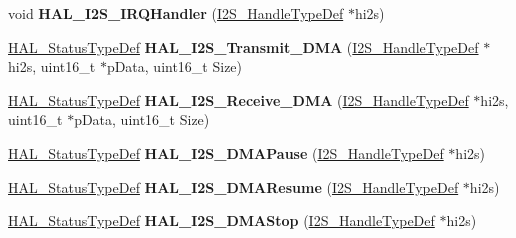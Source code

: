 \begin{DoxyCompactItemize}
\item 
void {\bfseries H\+A\+L\+\_\+\+I2\+S\+\_\+\+I\+R\+Q\+Handler} (\hyperlink{struct_i2_s___handle_type_def}{I2\+S\+\_\+\+Handle\+Type\+Def} $\ast$hi2s)\hypertarget{group___i2_s___exported___functions___group2_gad5fe9157152a3c5baac47b877d534f4e}{}\label{group___i2_s___exported___functions___group2_gad5fe9157152a3c5baac47b877d534f4e}

\item 
\hyperlink{stm32f4xx__hal__def_8h_a63c0679d1cb8b8c684fbb0632743478f}{H\+A\+L\+\_\+\+Status\+Type\+Def} {\bfseries H\+A\+L\+\_\+\+I2\+S\+\_\+\+Transmit\+\_\+\+D\+MA} (\hyperlink{struct_i2_s___handle_type_def}{I2\+S\+\_\+\+Handle\+Type\+Def} $\ast$hi2s, uint16\+\_\+t $\ast$p\+Data, uint16\+\_\+t Size)\hypertarget{group___i2_s___exported___functions___group2_ga97fa0c086e3980597e1e3962b2dfc322}{}\label{group___i2_s___exported___functions___group2_ga97fa0c086e3980597e1e3962b2dfc322}

\item 
\hyperlink{stm32f4xx__hal__def_8h_a63c0679d1cb8b8c684fbb0632743478f}{H\+A\+L\+\_\+\+Status\+Type\+Def} {\bfseries H\+A\+L\+\_\+\+I2\+S\+\_\+\+Receive\+\_\+\+D\+MA} (\hyperlink{struct_i2_s___handle_type_def}{I2\+S\+\_\+\+Handle\+Type\+Def} $\ast$hi2s, uint16\+\_\+t $\ast$p\+Data, uint16\+\_\+t Size)\hypertarget{group___i2_s___exported___functions___group2_gaadf898fd8ef5c8349c3a61c2e3e7720e}{}\label{group___i2_s___exported___functions___group2_gaadf898fd8ef5c8349c3a61c2e3e7720e}

\item 
\hyperlink{stm32f4xx__hal__def_8h_a63c0679d1cb8b8c684fbb0632743478f}{H\+A\+L\+\_\+\+Status\+Type\+Def} {\bfseries H\+A\+L\+\_\+\+I2\+S\+\_\+\+D\+M\+A\+Pause} (\hyperlink{struct_i2_s___handle_type_def}{I2\+S\+\_\+\+Handle\+Type\+Def} $\ast$hi2s)\hypertarget{group___i2_s___exported___functions___group2_ga374ecf3a61ff460938af93e9b788f09b}{}\label{group___i2_s___exported___functions___group2_ga374ecf3a61ff460938af93e9b788f09b}

\item 
\hyperlink{stm32f4xx__hal__def_8h_a63c0679d1cb8b8c684fbb0632743478f}{H\+A\+L\+\_\+\+Status\+Type\+Def} {\bfseries H\+A\+L\+\_\+\+I2\+S\+\_\+\+D\+M\+A\+Resume} (\hyperlink{struct_i2_s___handle_type_def}{I2\+S\+\_\+\+Handle\+Type\+Def} $\ast$hi2s)\hypertarget{group___i2_s___exported___functions___group2_gaa86501283bd6988e4106af51cda75945}{}\label{group___i2_s___exported___functions___group2_gaa86501283bd6988e4106af51cda75945}

\item 
\hyperlink{stm32f4xx__hal__def_8h_a63c0679d1cb8b8c684fbb0632743478f}{H\+A\+L\+\_\+\+Status\+Type\+Def} {\bfseries H\+A\+L\+\_\+\+I2\+S\+\_\+\+D\+M\+A\+Stop} (\hyperlink{struct_i2_s___handle_type_def}{I2\+S\+\_\+\+Handle\+Type\+Def} $\ast$hi2s)\hypertarget{group___i2_s___exported___functions___group2_gae8d79cd1625530f161cd6651ef5135a3}{}\label{group___i2_s___exported___functions___group2_gae8d79cd1625530f161cd6651ef5135a3}


\end{DoxyCompactItemize}
